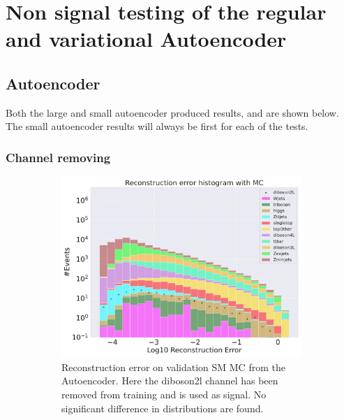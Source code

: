 \section{Non signal testing of the regular and variational Autoencoder}


\subsection*{Autoencoder}
Both the large and small autoencoder produced results, and are shown below. The small autoencoder results will always be first for each of the tests. 
\subsubsection*{Channel removing}

\begin{figure}[h!]
    \centering
    \begin{subfigure}{.8\textwidth}
        \includegraphics[width=\textwidth]{Figures/AE_testing/small/b_data_recon_big_rm3_feats_sig_diboson2L.pdf}
        \caption{Reconstruction error on validation SM MC from the Autoencoder. Here the diboson2l channel has been removed from training and 
        is used as signal. No significant difference in distributions are found.}
        \label{fig:ae_small_diboson2l}
    \end{subfigure}
    \hfill
    \begin{subfigure}{.8\textwidth}

\end{subfigure}
\end{figure}

